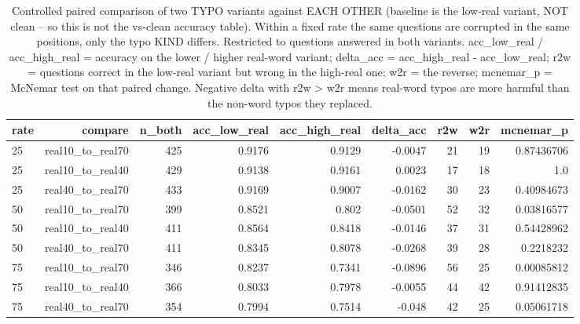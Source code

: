\documentclass[11pt]{article}
\begin{document}
\begin{table}[H]
\centering
\caption{Controlled paired comparison of two TYPO variants against EACH OTHER (baseline is the low-real variant, NOT clean -- so this is not the vs-clean accuracy table). Within a fixed rate the same questions are corrupted in the same positions, only the typo KIND differs. Restricted to questions answered in both variants. acc\_low\_real / acc\_high\_real = accuracy on the lower / higher real-word variant; delta\_acc = acc\_high\_real - acc\_low\_real; r2w = questions correct in the low-real variant but wrong in the high-real one; w2r = the reverse; mcnemar\_p = McNemar test on that paired change. Negative delta with r2w > w2r means real-word typos are more harmful than the non-word typos they replaced.}
\small
\begin{adjustbox}{max width=\textwidth}
\begin{tabular}{lrrrrrrrr}
\toprule
\textbf{rate} & \textbf{compare} & \textbf{n\_both} & \textbf{acc\_low\_real} & \textbf{acc\_high\_real} & \textbf{delta\_acc} & \textbf{r2w} & \textbf{w2r} & \textbf{mcnemar\_p} \\
\midrule
25 & real10\_to\_real70 & 425 & 0.9176 & 0.9129 & -0.0047 & 21 & 19 & 0.87436706 \\
25 & real10\_to\_real40 & 429 & 0.9138 & 0.9161 & 0.0023 & 17 & 18 & 1.0 \\
25 & real40\_to\_real70 & 433 & 0.9169 & 0.9007 & -0.0162 & 30 & 23 & 0.40984673 \\
50 & real10\_to\_real70 & 399 & 0.8521 & 0.802 & -0.0501 & 52 & 32 & 0.03816577 \\
50 & real10\_to\_real40 & 411 & 0.8564 & 0.8418 & -0.0146 & 37 & 31 & 0.54428962 \\
50 & real40\_to\_real70 & 411 & 0.8345 & 0.8078 & -0.0268 & 39 & 28 & 0.2218232 \\
75 & real10\_to\_real70 & 346 & 0.8237 & 0.7341 & -0.0896 & 56 & 25 & 0.00085812 \\
75 & real10\_to\_real40 & 366 & 0.8033 & 0.7978 & -0.0055 & 44 & 42 & 0.91412835 \\
75 & real40\_to\_real70 & 354 & 0.7994 & 0.7514 & -0.048 & 42 & 25 & 0.05061718 \\
\bottomrule
\end{tabular}
\end{adjustbox}
\end{table}
\end{document}
